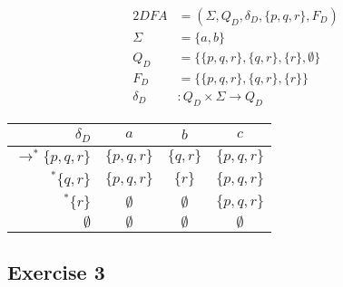 \documentclass[docid=TP04]{tcom_TP}
\begin{document}
{\begin{center}
\end{center}
\begin{center}
\begin{minipage}[c]{0.35\textwidth}
\begin{alignat*}{2}
	DFA       &= (\Sigma, Q_D, \delta_D, \{p,q,r\}, F_D)\\
	\Sigma    &= \{a,b\}\\
	Q_D       &= \{\{p,q,r\},\{q,r\},\{r\},\emptyset\}\\
	F_D       &= \{\{p,q,r\},\{q,r\},\{r\}\}\\
	\delta_D &\colon Q_D \times \Sigma \rightarrow Q_D
\end{alignat*}
\end{minipage}%
\begin{minipage}[c]{0.45\textwidth}
\begin{center}
\begin{tabular}{ r | c c c }
    $\delta_D$ & $a$ & $b$ & $c$ \\ \hline
    $\rightarrow^* \{p,q,r\}$ & $\{p,q,r\}$ & $\{  q,r\}$ & $\{p,q,r\}$ \\
    $           ^* \{  q,r\}$ & $\{p,q,r\}$ & $\{    r\}$ & $\{p,q,r\}$ \\
    $           ^* \{    r\}$ & $\emptyset$ & $\emptyset$ & $\{p,q,r\}$\\
    $ \emptyset                $ & $\emptyset$ & $\emptyset$ & $\emptyset$
\end{tabular}
\end{center}
\end{minipage}
\end{center}
\subsection{Exercise 3}
}
\end{document}
